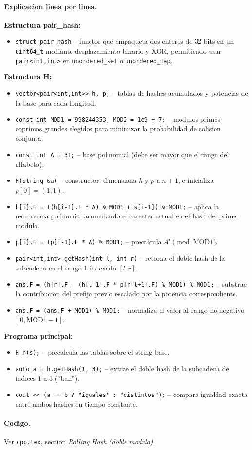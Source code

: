 \paragraph{Explicacion linea por linea.}
\textbf{Estructura pair\_hash:}
\begin{itemize}\setlength\itemsep{0pt}
	\item \verb|struct pair_hash| -- functor que empaqueta dos enteros de 32 bits en un \verb|uint64_t| mediante desplazamiento binario y XOR, permitiendo usar \verb|pair<int,int>| en \verb|unordered_set| o \verb|unordered_map|.
\end{itemize}
\textbf{Estructura H:}
\begin{itemize}\setlength\itemsep{0pt}
	\item \verb|vector<pair<int,int>> h, p;| -- tablas de hashes acumulados y potencias de la base para cada longitud.
	\item \verb|const int MOD1 = 998244353, MOD2 = 1e9 + 7;| -- modulos primos coprimos grandes elegidos para minimizar la probabilidad de colision conjunta.
	\item \verb|const int A = 31;| -- base polinomial (debe ser mayor que el rango del alfabeto).
	\item \verb|H(string &a)| -- constructor: dimensiona $h$ y $p$ a $n + 1$, e inicializa $p[0] = (1, 1)$.
	\item \verb|h[i].F = ((h[i-1].F * A) % MOD1 + s[i-1]) % MOD1;| -- aplica la recurrencia polinomial acumulando el caracter actual en el hash del primer modulo.
	\item \verb|p[i].F = (p[i-1].F * A) % MOD1;| -- precalcula $A^i \pmod{\text{MOD1}}$.
	\item \verb|pair<int,int> getHash(int l, int r)| -- retorna el doble hash de la subcadena en el rango 1-indexado $[l, r]$.
	\item \verb|ans.F = (h[r].F - (h[l-1].F * p[r-l+1].F) % MOD1) % MOD1;| -- substrae la contribucion del prefijo previo escalado por la potencia correspondiente.
	\item \verb|ans.F = (ans.F + MOD1) % MOD1;| -- normaliza el valor al rango no negativo $[0, \text{MOD1}-1]$.
\end{itemize}
\textbf{Programa principal:}
\begin{itemize}\setlength\itemsep{0pt}
	\item \verb|H h(s);| -- precalcula las tablas sobre el string base.
	\item \verb|auto a = h.getHash(1, 3);| -- extrae el doble hash de la subcadena de indices 1 a 3 (``ban'').
	\item \verb|cout << (a == b ? "iguales" : "distintos");| -- compara igualdad exacta entre ambos hashes en tiempo constante.
\end{itemize}

\paragraph{Codigo.}
Ver \texttt{cpp.tex}, seccion \textit{Rolling Hash (doble modulo)}.

\vspace{0.5em}

